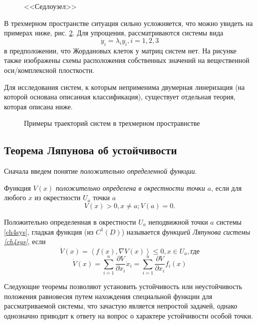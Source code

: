 \begin{figure}[h]
	\caption{<<Седлоузел>>}\label{ch4sadnode}
	

\end{figure}

В трехмерном пространстве ситуация сильно усложняется, что можно увидеть на примерах ниже, рис. \ref{ch4exs}. Для упрощения, рассматриваются системы вида 
$$ \dot y_i = \lambda_i y_i, i =1,2,3$$
в предположении, что Жордановых клеток у матриц систем нет. На рисунке также изображены схемы расположения собственных значений на вещественной оси/комплексной плосткости.

Для исследования систем, к которым неприменима двумерная линеризация (на которой основана описанная классификация), существует отдельная теория, которая описана ниже.

\begin{figure}[h]
	\caption{Примеры траекторий систем в трехмерном простравнстве}\label{ch4exs}
	

\end{figure}

\subsection{Теорема Ляпунова об устойчивости}

Сначала введем понятие \textit{положительно определенной функции}.
\begin{definition}
Функция $V(x)$  \textit{положительно определена в окрестности точки $a$}, если для любого $x$ из окрестности $U_a$ точки $a$
$$
V(x) > 0, x \neq a; V(a) = 0.
$$
\end{definition}
\begin{definition}
Положительно определенная в окрестности $U_a$ неподвижной точки $a$ системы \eqref{ch4sys}, гладкая функция (из $C^1(D)$) называется  \textit{функцией Ляпунова системы \eqref{ch4sys}}, если 
$$
\dot V(x) = \left< f(x), \nabla V(x) \right> \leqslant 0, x \in U_a , \text{где}
$$
$$
\dot V(x) = \sum\limits_{i=1}^n \frac{\partial V}{\partial x_i} \dot x_i = \sum\limits_{i=1}^n \frac{\partial V}{\partial x_i} f_i(x)
$$
\end{definition}

Следующие теоремы позволяют установить устойчивость или неустойчивость положения равновесия путем нахождения специальной функции  для рассматриваемой системы, что зачастую является непростой задачей, однако однозначно приводит к ответу на вопрос о характере устойчивости особой точки.


